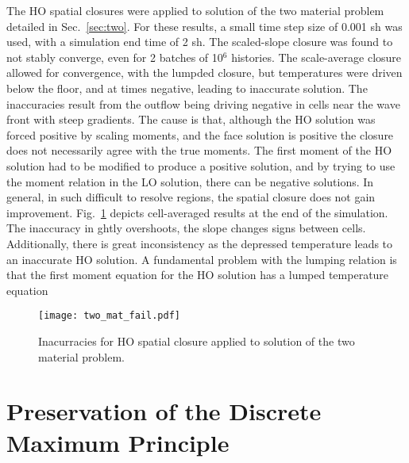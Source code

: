 The HO spatial closures were applied to solution of the two material problem detailed in Sec.~\ref{sec:two}.
For these results, a small time step size of 0.001 sh was used, with a simulation end time
of 2 sh.  The scaled-slope closure was found to not stably converge, even for 2 batches of 10$^6$
histories.  The scale-average closure allowed for convergence, with the lumpded closure, but temperatures were driven
below the floor, and at times negative, leading to inaccurate solution.  The inaccuracies
result from the outflow being driving negative in cells near the wave front with steep
gradients.  The cause is that, although the HO solution was forced positive by scaling
moments, and the face solution is positive the closure does not necessarily agree with the
true moments. The first moment of the HO solution had to be modified to produce a positive
solution, and by trying to use the moment relation in the LO solution, there can be
negative solutions.  In general, in such difficult to resolve regions, the spatial closure
does not gain improvement.
Fig.~\ref{fig:two_mat_fail} depicts cell-averaged results at the end of the simulation.
The inaccuracy in ghtly overshoots, the slope changes signs between cells.  Additionally,
there is great inconsistency as the depressed temperature leads to an inaccurate HO solution.
A fundamental problem with the lumping relation is that the first moment equation for the
HO solution has a lumped temperature equation
\begin{figure}[H]
    \centering
    \texttt{[image: two\_mat\_fail.pdf]}
    \caption{\label{fig:two_mat_fail}Inacurracies for HO spatial closure applied to
    solution of the two material problem.}
\end{figure}




\section{Preservation of the Discrete Maximum Principle}

